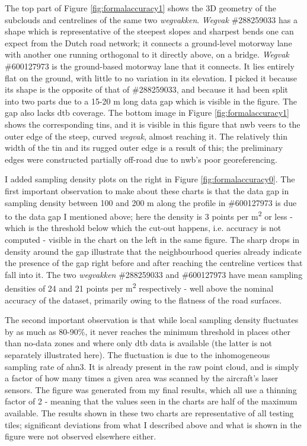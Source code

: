 The top part of Figure \ref{fig:formalaccuracy1} shows the 3D geometry of the subclouds and centrelines of the same two \textit{wegvakken}. \textit{Wegvak} \#288259033 has a shape which is representative of the steepest slopes and sharpest bends one can expect from the Dutch road network; it connects a ground-level motorway lane with another one running orthogonal to it directly above, on a bridge. \textit{Wegvak} \#600127973 is the ground-based motorway lane that it connects. It lies entirely flat on the ground, with little to no variation in its elevation. I picked it because its shape is the opposite of that of \#288259033, and because it had been split into two parts due to a 15-20 m long data gap which is visible in the figure. The gap also lacks \ac{dtb} coverage. The bottom image in Figure \ref{fig:formalaccuracy1} shows the corresponding \ac{tin}s, and it is visible in this figure that \ac{nwb} veers to the outer edge of the steep, curved \textit{wegvak}, almost reaching it. The relatively thin width of the \ac{tin} and its rugged outer edge is a result of this; the preliminary edges were constructed partially off-road due to \ac{nwb}'s poor georeferencing.

I added sampling density plots on the right in Figure \ref{fig:formalaccuracy0}. The first important observation to make about these charts is that the data gap in sampling density between 100 and 200 m along the profile in \#600127973 is due to the data gap I mentioned above; here the density is 3 points per m\textsuperscript{2} or less - which is the threshold below which the cut-out happens, i.e. accuracy is not computed - visible in the chart on the left in the same figure. The sharp drops in density around the gap illustrate that the neighbourhood queries already indicate the presence of the gap right before and after reaching the centreline vertices that fall into it. The two \textit{wegvakken} \#288259033 and \#600127973 have mean sampling densities of 24 and 21 points per m\textsuperscript{2} respectively - well above the nominal accuracy of the dataset, primarily owing to the flatness of the road surfaces.

The second important observation is that while local sampling density fluctuates by as much as 80-90\%, it never reaches the minimum threshold in places other than no-data zones and where only \ac{dtb} data is available (the latter is not separately illustrated here). The fluctuation is due to the inhomogeneous sampling rate of \ac{ahn3}. It is already present in the raw point cloud, and is simply a factor of how many times a given area was scanned by the aircraft's laser sensors. The figure was generated from my final results, which all use a thinning factor of 2 - meaning that the values seen in the charts are half of the maximum available. The results shown in these two charts are representative of all testing tiles; significant deviations from what I described above and what is shown in the figure were not observed elsewhere either.

